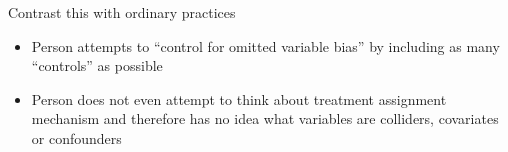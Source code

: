 \documentclass{beamer}
\begin{document}
\begin{frame}{Contrast this with ordinary practices}

\begin{itemize}
\item Person attempts to ``control for omitted variable bias'' by including as many ``controls'' as possible
\item Person does not even attempt to think about treatment assignment mechanism and therefore has no idea what variables are colliders, covariates or confounders
\end{itemize}

\end{frame}
\end{document}
